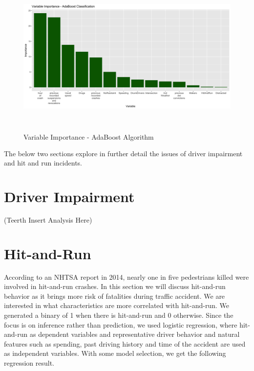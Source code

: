\documentclass[11pt, oneside,titlepage]{article}   	%
\begin{document}
\begin{figure}[H]
\centering
  \includegraphics[width=15cm,height=8cm,keepaspectratio]{ImportancePlot_ADABoost.png}
\caption{Variable Importance - AdaBoost Algorithm}
\end{figure}

The below two sections explore in further detail the issues of driver impairment and hit and run incidents.

\section*{Driver Impairment}

(Teerth Insert Analysis Here)

\section*{Hit-and-Run}

According to an NHTSA report in 2014, nearly one in five pedestrians killed were involved in hit-and-run crashes. In this section we will discuss hit-and-run behavior as it brings more risk of fatalities during traffic accident. We are interested in what characteristics are more correlated with hit-and-run. We generated a binary of 1 when there is hit-and-run and 0 otherwise. Since the focus is on inference rather than prediction, we used logistic regression, where hit-and-run as dependent variables and representative driver behavior and natural features such as spending, past driving history and time of the accident are used as independent variables. With some model selection, we get the following regression result.  
\end{document}
